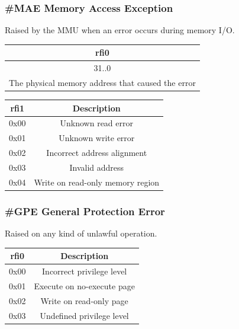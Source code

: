 \documentclass[a4paper,10pt]{article}
\begin{document}
\subsubsection{\#MAE Memory Access Exception} \label {ir:MAE}
Raised by the MMU when an error occurs during memory I/O.

\begin{table}[H]
	\centering
	{
		\begin{tabular}{|c|}
\hline
rfi0 \\
\hline
31..0 \\
\hline
The physical memory address that caused the error \\
\hline
		\end{tabular}
	}
\end{table}

\begin{table}[H]
	\centering
	{
		\begin{tabular}{|c|c|}
\hline
rfi1 & Description \\
\hline
0x00 & Unknown read error \\
\hline
0x01 & Unknown write error \\
\hline
0x02 & Incorrect address alignment \\
\hline
0x03 & Invalid address \\
\hline
0x04 & Write on read-only memory region \\
\hline
		\end{tabular}
	}
\end{table}

\subsubsection{\#GPE General Protection Error} \label {ir:GPE}
Raised on any kind of unlawful operation.

\begin{table}[H]
	\centering
	{
		\begin{tabular}{|c|c|}
\hline
rfi0 & Description \\
\hline
0x00 & Incorrect privilege level \\
\hline
0x01 & Execute on no-execute page \\
\hline
0x02 & Write on read-only page \\
\hline
0x03 & Undefined privilege level \\
\hline
		\end{tabular}
	}
\end{table}
\end{document}
